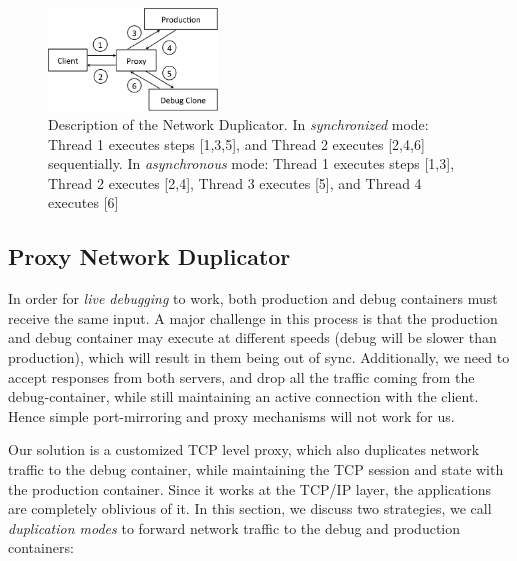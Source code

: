 \begin{figure}[ht]
  \begin{centering}
    \includegraphics[width=0.4\textwidth]{figs/network_dup.pdf}
    \caption{Description of the Network Duplicator. In \textit{synchronized} mode: Thread 1 executes steps [1,3,5], and Thread 2 executes [2,4,6] sequentially. In \textit{asynchronous} mode: Thread 1 executes steps [1,3], Thread 2 executes [2,4], Thread 3 executes [5], and Thread 4 executes [6]}
    \label{fig:duplicator}
  \end{centering}
\end{figure}

\subsection{Proxy Network Duplicator} 
\label{sec:proxyDuplicator}

In order for \textit{live debugging} to work, both production and debug containers must receive the same input.
A major challenge in this process is that the production and debug container may execute at different speeds (debug will be slower than production), which will result in them being out of sync.
Additionally, we need to accept responses from both servers, and drop all the traffic coming from the debug-container, while still maintaining an active connection with the client.
Hence simple port-mirroring and proxy mechanisms will not work for us.

Our solution is a customized TCP level proxy, which also duplicates network traffic to the debug container, while maintaining the TCP session and state with the production container. 
Since it works at the TCP/IP layer, the applications are completely oblivious of it.
In this section, we discuss two strategies, we call \textit{duplication modes} to forward network traffic to the debug and production containers:
%

